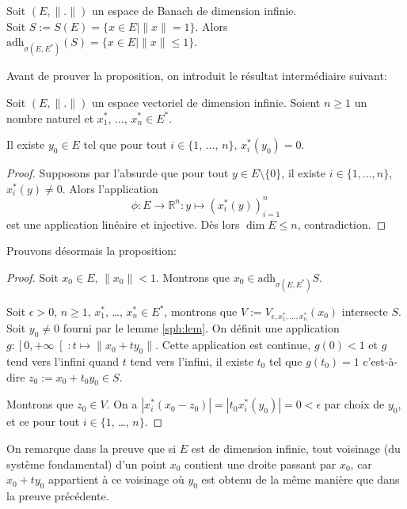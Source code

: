 \begin{prop}
  Soit $(E, \|.\|)$ un espace de Banach de dimension infinie.\\
  Soit $S := S(E) = \{x\in E\mid \|x\| = 1\}$. Alors
  $\mathrm{adh}_{\sigma(E, E^*)}(S) = \{x\in E\mid \|x\|\leq 1\}$.
\end{prop}
Avant de prouver la proposition, on introduit le résultat intermédiaire
suivant:
\begin{lem}
  Soit $(E, \|.\|)$ un espace vectoriel de dimension infinie. Soient
  $n\geq 1$ un nombre naturel et $x_1^*$, $\ldots$, $x_n^*\in E^*$.

  Il existe $y_0\in E$ tel que pour tout $i\in \{1$, $\ldots$, $n\}$,
  $x_i^*(y_0)=0$.
\end{lem}

\begin{proof}\label{sph:lem}
  Supposons par l'absurde que pour tout $y\in E\setminus \{0\}$,
  il existe $i\in\{1, \ldots, n\}$, $x_i^*(y)\neq 0$. Alors l'application
  $$\phi: E\to\mathbb{R}^n: y\mapsto (x_i^*(y))_{i=1}^n$$
  est une application linéaire et injective. Dès lors $\dim E\leq n$,
  contradiction.
\end{proof}

Prouvons désormais la proposition:
\begin{proof}
  Soit $x_0\in E$, $\|x_0\| < 1$. Montrons que
  $x_0\in \mathrm{adh}_{\sigma(E, E^*)}S$.

  Soit $\epsilon >0$, $n\geq 1$, $x_1^*$, \ldots, $x_n^*\in E^*$,
  montrons que $V:=V_{\epsilon, x_1^*, \ldots, x_n^*}(x_0)$ intersecte $S$.
  Soit $y_0\neq 0$ fourni par le lemme \ref{sph:lem}. On définit une
  application $g:\left[0, +\infty\right[: t\mapsto \|x_0 + ty_0\|$.
  Cette application est continue, $g(0)<1$ et $g$ tend vers l'infini
  quand $t$ tend vers l'infini, il existe $t_0$ tel que $g(t_0) = 1$
  c'est-à-dire $z_0:=x_0 + t_0y_0\in S$.

  Montrons que $z_0\in V$. On a $|x_i^*(x_0 - z_0)|= |t_0x^*_i(y_0)| =
  0 < \epsilon$ par choix de $y_0$, et ce pour tout $i\in\{1$, \ldots, $n\}$.
\end{proof}

\begin{rem}
  On remarque dans la preuve que si $E$ est de dimension infinie,
  tout voisinage (du système fondamental) d'un point $x_0$ contient
  une droite passant par $x_0$, car $x_0 + ty_0$ appartient à ce voisinage
  où $y_0$ est obtenu de la même manière que dans la preuve précédente.
\end{rem}

